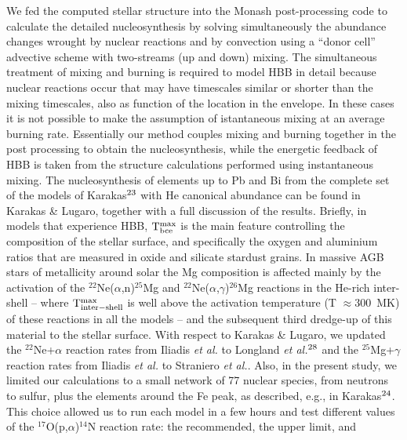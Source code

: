 \documentclass{nature}
\newcommand{\iso}[2]{\hbox{${}^{#1}${#2}}}
\begin{document}
\begin{methods}
We fed the computed stellar structure into the Monash post-processing code to calculate the detailed 
nucleosynthesis by solving simultaneously the abundance changes wrought by nuclear 
reactions and by convection using a ``donor cell'' advective scheme with two-streams (up and down) 
mixing. The simultaneous treatment of mixing and burning is required 
to model HBB in detail because nuclear reactions occur that may have timescales similar or shorter 
than the 
mixing timescales, also as function of the location in the envelope.
In these cases it is not possible to make the assumption of istantaneous mixing at an average 
burning rate. Essentially our method couples mixing and burning together in the post processing to 
obtain the nucleosynthesis, while the energetic feedback of HBB is 
taken from the structure calculations performed using instantaneous mixing.
The nucleosynthesis of elements up to Pb and Bi from the complete set of 
the models of Karakas$^{\mbox{\scriptsize 23\if@tempswa , 1\fi}}$
with He canonical abundance can be found in 
Karakas \& Lugaro\cite{karakas16}, together with a full discussion of the results. Briefly, in 
models that experience HBB, ${\rm T}^{\rm max}_{\rm bce}$ is the main feature controlling the 
composition of the stellar surface, and specifically the oxygen and aluminium ratios that are 
measured in oxide and silicate stardust grains. In massive AGB stars of 
metallicity around solar the Mg composition is affected mainly  
by the activation of the 
\iso{22}Ne($\alpha$,n)\iso{25}Mg and \iso{22}Ne($\alpha$,$\gamma$)\iso{26}Mg reactions 
in the He-rich inter-shell -- 
where ${\rm T}^{\rm max}_{\rm inter-shell}$ is well above the activation temperature (T $\approx 300$~MK) 
of these reactions in all the models --
and the subsequent third dredge-up of this material to the 
stellar surface. With respect to Karakas \& Lugaro\cite{karakas16}, 
we updated the \iso{22}Ne+$\alpha$ reaction rates from 
Iliadis {\it et al.}\cite{iliadis10} to Longland 
{\it et al.}$^{\mbox{\scriptsize 28\if@tempswa , 1\fi}}$
and 
the \iso{25}Mg+$\gamma$ reaction rates 
from Iliadis {\it et al.}\cite{iliadis10} to Straniero {\it et al.}\cite{straniero13}. 
Also, in the present study, we limited 
our calculations to a small network of 77 nuclear species, from neutrons to 
sulfur, plus the elements around the Fe peak, as described, e.g., in 
Karakas$^{\mbox{\scriptsize 24\if@tempswa , 1\fi}}$.
This 
choice allowed us to 
run each model in a few hours and test different values of the 
\iso{17}O(p,$\alpha$)\iso{14}N reaction rate: the recommended, the upper limit, and 

\end{methods}
\end{document}
